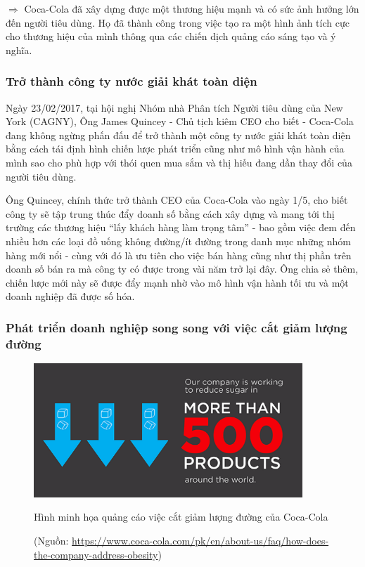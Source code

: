 \documentclass{article}
\begin{document}
    \vspace{0.2cm}
    $\Rightarrow$ Coca-Cola đã xây dựng được một thương hiệu mạnh và có sức ảnh hưởng lớn đến người tiêu dùng. Họ đã thành công trong việc tạo ra một hình ảnh tích cực cho thương hiệu của mình thông qua các chiến dịch quảng cáo sáng tạo và ý nghĩa.
    
    \subsubsection{Trở thành công ty nước giải khát toàn diện}
    \vspace{0.2cm}
    Ngày 23/02/2017, tại hội nghị Nhóm nhà Phân tích Người tiêu dùng của New York (CAGNY), Ông James Quincey - Chủ tịch kiêm CEO cho biết - Coca-Cola đang không ngừng phấn đấu để trở thành một công ty nước giải khát toàn diện bằng cách tái định hình chiến lược phát triển cũng như mô hình vận hành của mình sao cho phù hợp với thói quen mua sắm và thị hiếu đang dần thay đổi của người tiêu dùng.

    \vspace{0.2cm}
    Ông Quincey, chính thức trở thành CEO của Coca-Cola vào ngày 1/5, cho biết công ty sẽ tập trung thúc đẩy doanh số bằng cách xây dựng và mang tới thị trường các thương hiệu “lấy khách hàng làm trọng tâm” - bao gồm việc đem đến nhiều hơn các loại đồ uống không đường/ít đường trong danh mục những nhóm hàng mới nổi - cùng với đó là ưu tiên cho việc bán hàng cũng như thị phần trên doanh số bán ra mà công ty có được trong vài năm trở lại đây. Ông chia sẻ thêm, chiến lược mới này sẽ được đẩy mạnh nhờ vào mô hình vận hành tối ưu và một doanh nghiệp đã được số hóa.
    
    \subsubsection{Phát triển doanh nghiệp song song với việc cắt giảm lượng đường}
    \begin{figure}[H]
        \centering
        \includegraphics[width=0.9\textwidth]{assert/img7.png}
        \caption{Hình minh họa quảng cáo việc cắt giảm lượng đường của Coca-Cola}
        \caption*{(Nguồn: \href{https://www.coca-cola.com/pk/en/about-us/faq/how-does-the-company-address-obesity}{https://www.coca-cola.com/pk/en/about-us/faq/how-does-the-company-address-obesity})}
        \label{fig:img7}
    \end{figure}
\end{document}
